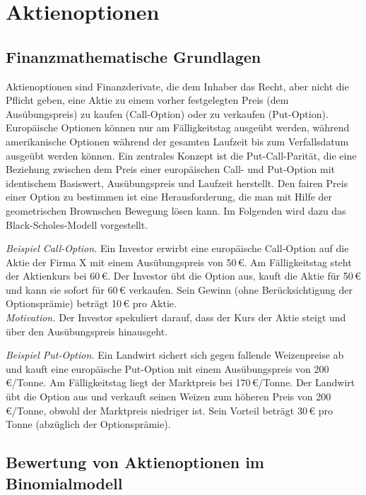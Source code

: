 \section{Aktienoptionen}

\subsection{Finanzmathematische Grundlagen}

Aktienoptionen sind Finanzderivate, die dem Inhaber das Recht, aber nicht die Pflicht geben, 
eine Aktie zu einem vorher festgelegten Preis (dem Ausübungspreis) zu kaufen (Call-Option) 
oder zu verkaufen (Put-Option). Europäische Optionen können nur am Fälligkeitstag ausgeübt 
werden, während amerikanische Optionen während der gesamten Laufzeit bis zum Verfallsdatum 
ausgeübt werden können. Ein zentrales Konzept ist die Put-Call-Parität, die eine Beziehung 
zwischen dem Preis einer europäischen Call- und Put-Option mit identischem Basiswert, 
Ausübungspreis und Laufzeit herstellt. Den fairen Preis einer Option zu bestimmen ist eine Herausforderung,
die man mit Hilfe der geometrischen Brownschen Bewegung lösen kann. Im Folgenden wird dazu das Black-Scholes-Modell 
vorgestellt.

\begin{bsp}
\textit{Beispiel Call-Option.} 
Ein Investor erwirbt eine europäische Call-Option auf die Aktie der Firma X mit einem
 Ausübungspreis von 50\,€. Am Fälligkeitstag steht der Aktienkurs bei 60\,€. 
 Der Investor übt die Option aus, kauft die Aktie für 50\,€ und kann 
 sie sofort für 60\,€ verkaufen. Sein Gewinn (ohne Berücksichtigung der Optionsprämie) 
 beträgt 10\,€ pro Aktie.\\
\textit{Motivation.} Der Investor spekuliert darauf, dass der Kurs der Aktie steigt 
und über den Ausübungspreis hinausgeht.

\textit{Beispiel Put-Option.}
Ein Landwirt sichert sich gegen fallende Weizenpreise ab und kauft eine europäische 
Put-Option mit einem Ausübungspreis von 200\,€/Tonne. Am Fälligkeitstag liegt der 
Marktpreis bei 170\,€/Tonne. Der Landwirt übt die Option aus und verkauft seinen 
Weizen zum höheren Preis von 200\,€/Tonne, obwohl der Marktpreis niedriger ist. 
Sein Vorteil beträgt 30\,€ pro Tonne (abzüglich der Optionsprämie).
\end{bsp}
% 
\subsection{Bewertung von Aktienoptionen im Binomialmodell}

